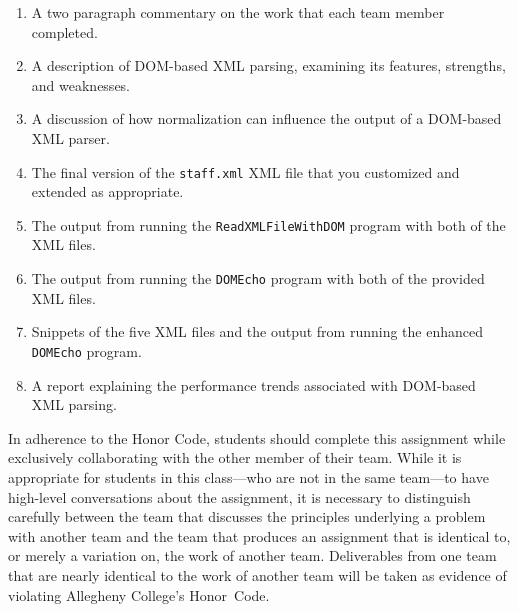 \vspace*{-.1in}
\begin{enumerate}
  \setlength{\itemsep}{0pt}
  \item A two paragraph commentary on the work that each team member completed. 
  \item A description of DOM-based XML parsing, examining its features, strengths, and weaknesses.
  \item A discussion of how normalization can influence the output of a DOM-based XML parser.
  \item The final version of the {\tt staff.xml} XML file that you customized and extended as appropriate.
  \item The output from running the {\tt ReadXMLFileWithDOM} program with both of the XML files.
  \item The output from running the {\tt DOMEcho} program with both of the provided XML files.
  \item Snippets of the five XML files and the output from running the enhanced {\tt DOMEcho} program.
  \item A report explaining the performance trends associated with DOM-based XML parsing.
\end{enumerate}
\vspace*{-.1in}

In adherence to the Honor Code, students should complete this assignment while exclusively collaborating with the
other member of their team. While it is appropriate for students in this class---who are not in the same team---to have
high-level conversations about the assignment, it is necessary to distinguish carefully between the team that discusses
the principles underlying a problem with another team and the team that produces an assignment that is identical to, or
merely a variation on, the work of another team.  Deliverables from one team that are nearly identical to the work of
another team will be taken as evidence of violating Allegheny College's \mbox{Honor Code}.



